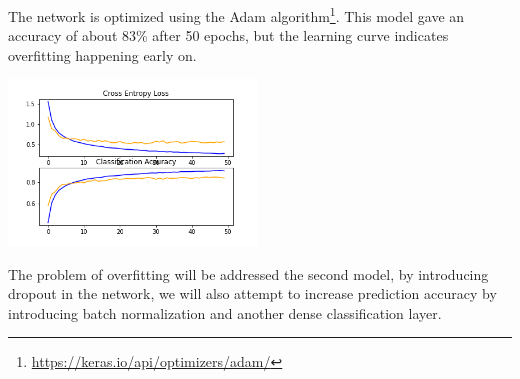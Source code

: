 The network is optimized using the Adam algorithm\footnote{\href{https://keras.io/api/optimizers/adam/}{https://keras.io/api/optimizers/adam/}}.
This model gave an accuracy of about 83\% after 50 epochs, but the learning curve indicates overfitting happening early on.
\begin{center}
    \captionsetup{type=figure}
    \includegraphics[width=250px]{sections/exp-2/images/initial-plot.png}
\end{center}
The problem of overfitting will be addressed the second model, by introducing dropout in the network, we will also attempt to increase prediction accuracy by introducing batch normalization and another dense classification layer.
